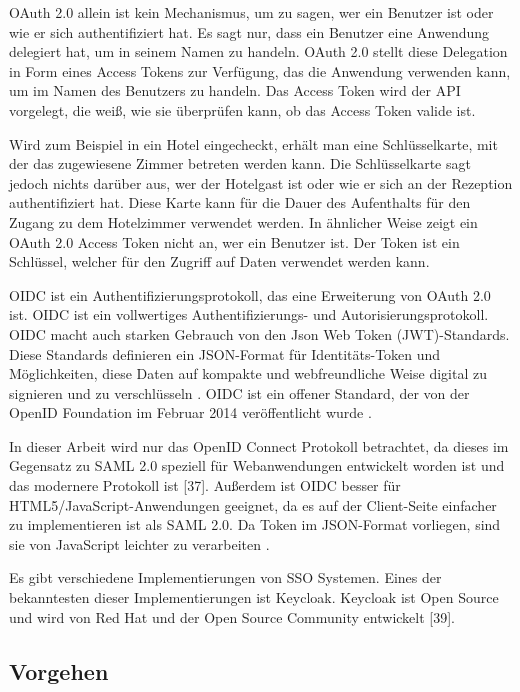 OAuth 2.0 allein ist kein Mechanismus, um zu sagen, wer ein Benutzer ist oder wie er sich authentifiziert hat. Es sagt nur, dass ein Benutzer eine Anwendung delegiert hat, um in seinem Namen zu handeln. OAuth 2.0 stellt diese Delegation in Form eines Access Tokens zur Verfügung, das die Anwendung verwenden kann, um im Namen des Benutzers zu handeln. Das Access Token wird der API vorgelegt, die weiß, wie sie überprüfen kann, ob das Access Token valide ist. \cite{AuthorizationvsAuthentication}

Wird zum Beispiel in ein Hotel eingecheckt, erhält man eine Schlüsselkarte, mit der das zugewiesene Zimmer betreten werden kann. Die Schlüsselkarte sagt jedoch nichts darüber aus, wer der Hotelgast ist oder wie er sich an der Rezeption authentifiziert hat. Diese Karte kann für die Dauer des Aufenthalts für den Zugang zu dem Hotelzimmer verwendet werden. In ähnlicher Weise zeigt ein OAuth 2.0 Access Token nicht an, wer ein Benutzer ist. Der Token ist ein Schlüssel, welcher für den Zugriff auf Daten verwendet werden kann. \cite{AuthorizationvsAuthentication}

OIDC ist ein Authentifizierungsprotokoll, das eine Erweiterung von OAuth 2.0 ist. OIDC ist ein vollwertiges Authentifizierungs- und Autorisierungsprotokoll. OIDC macht auch starken Gebrauch von den Json Web Token (JWT)-Standards. Diese Standards definieren ein JSON-Format für Identitäts-Token und Möglichkeiten, diese Daten auf kompakte und webfreundliche Weise digital zu signieren und zu verschlüsseln \cite{ssoProtocols}. OIDC ist ein offener Standard, der von der OpenID Foundation im Februar 2014 veröffentlicht wurde \cite{OAuth2inAction}.

In dieser Arbeit wird nur das OpenID Connect Protokoll betrachtet, da dieses im Gegensatz zu SAML 2.0 speziell für Webanwendungen entwickelt worden ist und das modernere Protokoll ist [37]. Außerdem ist OIDC besser für HTML5/JavaScript-Anwendungen geeignet, da es auf der Client-Seite einfacher zu implementieren ist als SAML 2.0. Da Token im JSON-Format vorliegen, sind sie von JavaScript leichter zu verarbeiten \cite{ssoProtocols}.

Es gibt verschiedene Implementierungen von SSO Systemen. Eines der bekanntesten dieser Implementierungen ist Keycloak. Keycloak ist Open Source und wird von Red Hat und der Open Source Community entwickelt [39].


\subsection{Vorgehen}

